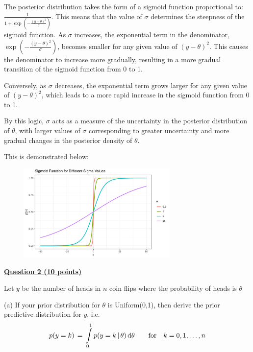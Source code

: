 \documentclass[12pt]{article}
\begin{document}
The posterior distribution takes the form of a sigmoid function proportional to: $\frac{1}{1 + \exp\left( -\frac{(y - \theta)^2}{\sigma} \right)}$.
This means that the value of $\sigma$ determines the steepness of the sigmoid function.  As $\sigma$
increases, the exponential term in the denominator, $\exp\left(-\frac{(y-\theta)^2}{\sigma}\right)$, becomes smaller for any given
value of $(y - \theta)^2$. This causes the denominator to increase more gradually, resulting in a more gradual transition of the sigmoid function from 0 to 1.


Conversely, as $\sigma$ decreases, the exponential term grows larger for any given value of $(y - \theta)^2$, which leads to a more rapid increase in the sigmoid function from 0 to 1.


By this logic, $\sigma$ acts as a measure of the uncertainty in the posterior distribution of $\theta$, with larger values of $\sigma$ corresponding to greater uncertainty and
more gradual changes in the posterior density of $\theta$.

This is demonstrated below:

\begin{figure}[h]
    \centering
    \includegraphics[width=0.7\textwidth]{q1c_plot.pdf}
\end{figure}

\bigskip

{\underline{\bf Question 2 (10 points)}}  

Let $y$ be the number of heads in $n$ coin flips where the probability of heads is $\theta$

(a) If your prior distribution for $\theta$ is Uniform(0,1), then derive the prior predictive
distribution for $y$, i.e.
\begin{eqnarray*}
p(y = k) \, = \, \int\limits_0^1 p(y = k \, | \, \theta) \, {\rm d} \theta  \qquad {\rm for} \quad k = 0,1,\ldots,n
\end{eqnarray*}
\end{document}
